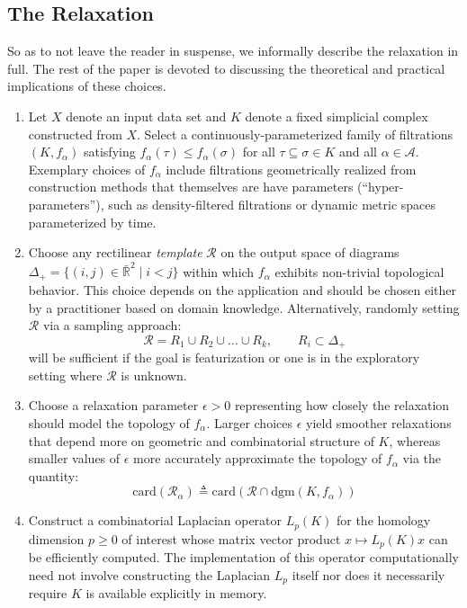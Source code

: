 \documentclass[12pt]{article}
\numberwithin{equation}{section}
\newcommand{\+}{%
	\raisebox{0.18ex}{\scaleobj{0.55}{+}}
}
\theoremstyle{definition}
\begin{document}
\subsection*{The Relaxation}
So as to not leave the reader in suspense, we informally describe the relaxation in full. The rest of the paper is devoted to discussing the theoretical and practical implications of these choices. 
\begin{enumerate}
	\item Let $X$ denote an input data set and $K$ denote a fixed simplicial complex constructed from $X$. Select a continuously-parameterized family of filtrations $(K, f_\alpha)$ satisfying $f_\alpha(\tau) \leq f_\alpha(\sigma)$ for all $\tau \subseteq \sigma \in K$ and all $\alpha \in \mathcal{A}$. Exemplary choices of $f_\alpha$ include filtrations geometrically realized from construction methods that themselves are have parameters (``hyper-parameters''), such as density-filtered filtrations or dynamic metric spaces parameterized by time.  
	\item Choose any rectilinear \emph{template} $\mathcal{R}$ on the output space of diagrams $\Delta_+ = \{(i,j) \in \bar{\mathbb{R}}^2  \mid i < j \}$ within which $f_\alpha$ exhibits non-trivial topological behavior. This choice depends on the application and should be chosen either by a practitioner based on domain knowledge. Alternatively, randomly setting $\mathcal{R}$ via a sampling approach:
	$$ \mathcal{R} = R_1 \cup R_2 \cup \dots \cup R_k, \quad \quad R_i \subset \Delta_+ $$ 
	will be sufficient if the goal is featurization or one is in the exploratory setting where $\mathcal{R}$ is unknown.
	\item Choose a relaxation parameter $\epsilon > 0$ representing how closely the relaxation should model the topology of $f_\alpha$. Larger choices $\epsilon$ yield smoother relaxations that depend more on geometric and combinatorial structure of $K$, whereas smaller values of $\epsilon$ more accurately approximate the topology of $f_\alpha$ via the quantity: 
	$$ \mathrm{card}(\mathcal{R}_\alpha) \triangleq \mathrm{card}(\mathcal{R} \cap \mathrm{dgm}(K, f_\alpha))$$
	\item Construct a combinatorial Laplacian operator $L_p(K)$ for the homology dimension $p \geq 0$ of interest whose matrix vector product $x \mapsto L_p(K) x$ can be efficiently computed. The implementation of this operator computationally need not involve constructing the Laplacian $L_p$ itself nor does it necessarily require $K$ is available explicitly in memory. 
\end{enumerate}
\end{document}
